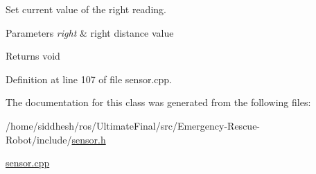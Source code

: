 Set current value of the right reading. 


\begin{DoxyParams}{Parameters}
{\em right} & right distance value \\
\hline
\end{DoxyParams}
\begin{DoxyReturn}{Returns}
void 
\end{DoxyReturn}


Definition at line 107 of file sensor.\+cpp.



The documentation for this class was generated from the following files\+:\begin{DoxyCompactItemize}
\item 
/home/siddhesh/ros/\+Ultimate\+Final/src/\+Emergency-\/\+Rescue-\/\+Robot/include/\mbox{\hyperlink{sensor_8h}{sensor.\+h}}\item 
\mbox{\hyperlink{sensor_8cpp}{sensor.\+cpp}}\end{DoxyCompactItemize}
